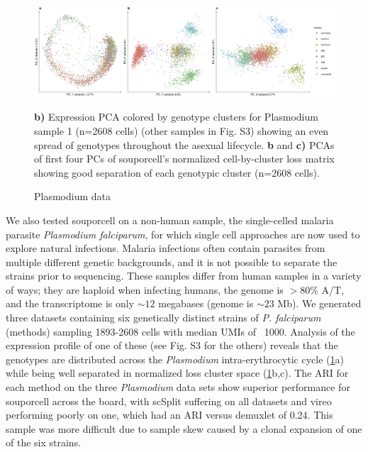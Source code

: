 \begin{figure}[htbp!]
\caption{Plasmodium data}
\label{figure:malaria}
\begin{centering}

\includegraphics[width=\textwidth]{malaria.jpg} 
\par{\textbf{b)} Expression PCA colored by genotype clusters for Plasmodium sample 1 (n=2608 cells) (other samples in Fig. S3) showing an even spread of genotypes throughout the asexual lifecycle. \textbf{b} and \textbf{c)} PCAs of first four PCs of souporcell's normalized cell-by-cluster loss matrix showing good separation of each genotypic cluster (n=2608 cells).}

\end{centering}
\end{figure}

\par{
We also tested souporcell on a non-human sample, the single-celled malaria parasite \textit{Plasmodium falciparum}, for which single cell approaches are now used to explore natural infections\cite{MCA}. Malaria infections often contain parasites from multiple different genetic backgrounds, and it is not possible to separate the strains prior to sequencing. These samples differ from human samples in a variety of ways; they are haploid when infecting humans, the genome is $>80$\% A/T, and the transcriptome is only $\sim12$ megabases (genome is $\sim23$ Mb). We generated three datasets containing six genetically distinct strains of \textit{P. falciparum} (methods) sampling 1893-2608 cells with median UMIs of ~1000. Analysis of the expression profile of one of these (see Fig. S3 for the others) reveals that the genotypes are distributed across the \textit{Plasmodium} intra-erythrocytic cycle (\ref{figure:malaria}a) while being well separated in normalized loss cluster space (\ref{figure:malaria}b,c). The ARI for each method on the three \textit{Plasmodium} data sets show superior performance for souporcell across the board, with scSplit suffering on all datasets and vireo performing poorly on one, which had an ARI versus demuxlet of 0.24. This sample was more difficult due to sample skew caused by a clonal expansion of one of the six strains.
}

